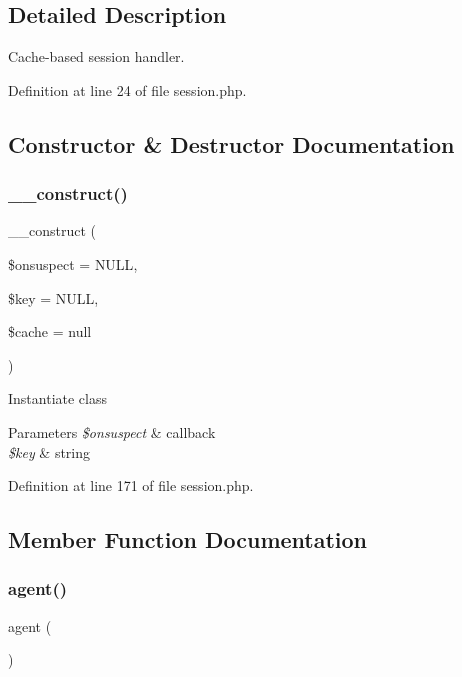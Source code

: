 \subsection{Detailed Description}
Cache-\/based session handler. 

Definition at line 24 of file session.\+php.



\subsection{Constructor \& Destructor Documentation}
\hypertarget{class_session_ab1c90919b8dc85f2d3eaf14f5b629815}{}\label{class_session_ab1c90919b8dc85f2d3eaf14f5b629815} 
\subsubsection{\texorpdfstring{\+\_\+\+\_\+construct()}{\_\_construct()}}
{\footnotesize\ttfamily \+\_\+\+\_\+construct (\begin{DoxyParamCaption}\item[{}]{\$onsuspect = {\ttfamily NULL},  }\item[{}]{\$key = {\ttfamily NULL},  }\item[{}]{\$cache = {\ttfamily null} }\end{DoxyParamCaption})}

Instantiate class 
\begin{DoxyParams}{Parameters}
{\em \$onsuspect} & callback \\
\hline
{\em \$key} & string \\
\hline
\end{DoxyParams}


Definition at line 171 of file session.\+php.



\subsection{Member Function Documentation}
\hypertarget{class_session_a77f6a261d70e66c7b7273774832482dc}{}\label{class_session_a77f6a261d70e66c7b7273774832482dc} 
\subsubsection{\texorpdfstring{agent()}{agent()}}
{\footnotesize\ttfamily agent (\begin{DoxyParamCaption}{ }\end{DoxyParamCaption})}


